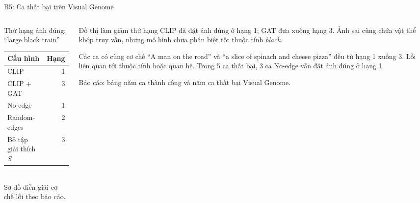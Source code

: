 \documentclass[aspectratio=169,10pt]{beamer}
\newcounter{backupslide}
\begin{document}
\begin{frame}[noframenumbering]{B5: Ca thất bại trên Visual Genome}
  \begin{columns}[c]
    \begin{column}{0.56\textwidth}
      \centering
      \begin{block}{Thứ hạng ảnh đúng: ``large black train''}\footnotesize
        \begin{tabularx}{\linewidth}{@{}Xr@{}}
          \toprule Cấu hình & Hạng\\ \midrule
          CLIP & 1\\ CLIP + GAT & 3\\ No-edge & 1\\ Random-edges & 2\\ Bỏ tập giải thích $S$ & 3\\ \bottomrule
        \end{tabularx}
      \end{block}
      \\[0.08cm]{\scriptsize\color{Slate} Sơ đồ diễn giải cơ chế lỗi theo báo cáo.}
    \end{column}
    \begin{column}{0.42\textwidth}
      \begin{alertblock}{Đồ thị làm giảm thứ hạng}\footnotesize
        CLIP đã đặt ảnh đúng ở hạng 1; GAT đưa xuống hạng 3. Ảnh sai cũng chứa vật thể khớp truy vấn, nhưng mô hình chưa phân biệt tốt thuộc tính \textit{black}.
      \end{alertblock}
      \begin{block}{Các ca có cùng cơ chế}\footnotesize
        ``A man on the road'' và ``a slice of spinach and cheese pizza'' đều từ hạng 1 xuống 3. Lỗi liên quan tới thuộc tính hoặc quan hệ. Trong 5 ca thất bại, 3 ca No-edge vẫn đặt ảnh đúng ở hạng 1.
      \end{block}
      {\scriptsize\color{Slate} Báo cáo: bảng năm ca thành công và năm ca thất bại Visual Genome.}
    \end{column}
  \end{columns}
\end{frame}
\end{document}
